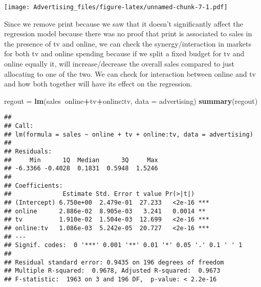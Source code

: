 \documentclass[
]{article}
\newenvironment{Shaded}{\begin{snugshade}}{\end{snugshade}}
\newcommand{\DataTypeTok}[1]{\textcolor[rgb]{0.13,0.29,0.53}{#1}}
\newcommand{\DecValTok}[1]{\textcolor[rgb]{0.00,0.00,0.81}{#1}}
\newcommand{\KeywordTok}[1]{\textcolor[rgb]{0.13,0.29,0.53}{\textbf{#1}}}
\newcommand{\NormalTok}[1]{#1}
\newcommand{\OperatorTok}[1]{\textcolor[rgb]{0.81,0.36,0.00}{\textbf{#1}}}
\newcommand{\StringTok}[1]{\textcolor[rgb]{0.31,0.60,0.02}{#1}}
\begin{document}
\begin{Shaded}
\end{Shaded}

\texttt{[image: Advertising\_files/figure-latex/unnamed-chunk-7-1.pdf]}

Since we remove print because we saw that it doesn't significantly
affect the regression model because there was no proof that print is
associated to sales in the presence of tv and online, we can check the
synergy/interaction in markets for both tv and online spending because
if we split a fixed budget for tv and online equally it, will
increase/decrease the overall sales compared to just allocating to one
of the two. We can check for interaction between online and tv and how
both together will have its effect on the regression.

\begin{Shaded}
\begin{Highlighting}[]
\NormalTok{regout =}\StringTok{ }\KeywordTok{lm}\NormalTok{(sales}\OperatorTok{~}\NormalTok{online}\OperatorTok{+}\NormalTok{tv}\OperatorTok{+}\NormalTok{online}\OperatorTok{:}\NormalTok{tv, }\DataTypeTok{data =}\NormalTok{ advertising)}
\KeywordTok{summary}\NormalTok{(regout)}
\end{Highlighting}
\end{Shaded}

\begin{verbatim}
## 
## Call:
## lm(formula = sales ~ online + tv + online:tv, data = advertising)
## 
## Residuals:
##     Min      1Q  Median      3Q     Max 
## -6.3366 -0.4028  0.1831  0.5948  1.5246 
## 
## Coefficients:
##              Estimate Std. Error t value Pr(>|t|)    
## (Intercept) 6.750e+00  2.479e-01  27.233   <2e-16 ***
## online      2.886e-02  8.905e-03   3.241   0.0014 ** 
## tv          1.910e-02  1.504e-03  12.699   <2e-16 ***
## online:tv   1.086e-03  5.242e-05  20.727   <2e-16 ***
## ---
## Signif. codes:  0 '***' 0.001 '**' 0.01 '*' 0.05 '.' 0.1 ' ' 1
## 
## Residual standard error: 0.9435 on 196 degrees of freedom
## Multiple R-squared:  0.9678, Adjusted R-squared:  0.9673 
## F-statistic:  1963 on 3 and 196 DF,  p-value: < 2.2e-16
\end{verbatim}
\end{document}

